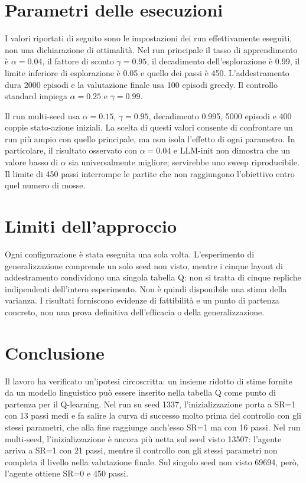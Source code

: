 \documentclass[12pt,a4paper]{article}
\begin{document}
\section{Parametri delle esecuzioni}\label{sec:iperparametri}
I valori riportati di seguito sono le impostazioni dei run effettivamente eseguiti, non una dichiarazione di ottimalità. Nel run principale il tasso di apprendimento è $\alpha=0.04$, il fattore di sconto $\gamma=0.95$, il decadimento dell'esplorazione è 0.99, il limite inferiore di esplorazione è 0.05 e quello dei passi è 450. L'addestramento dura 2000 episodi e la valutazione finale usa 100 episodi greedy. Il controllo standard impiega $\alpha=0.25$ e $\gamma=0.99$.

Il run multi-seed usa $\alpha=0.15$, $\gamma=0.95$, decadimento 0.995, 5000 episodi e 400 coppie stato-azione iniziali. La scelta di questi valori consente di confrontare un run più ampio con quello principale, ma non isola l'effetto di ogni parametro. In particolare, il risultato osservato con $\alpha=0.04$ e LLM-init non dimostra che un valore basso di $\alpha$ sia universalmente migliore; servirebbe uno sweep riproducibile. Il limite di 450 passi interrompe le partite che non raggiungono l'obiettivo entro quel numero di mosse.

\section{Limiti dell'approccio}\label{sec:limiti}
Ogni configurazione è stata eseguita una sola volta. L'esperimento di generalizzazione comprende un solo seed non visto, mentre i cinque layout di addestramento condividono una singola tabella Q: non si tratta di cinque repliche indipendenti dell'intero esperimento. Non è quindi disponibile una stima della varianza. I risultati forniscono evidenze di fattibilità e un punto di partenza concreto, non una prova definitiva dell'efficacia o della generalizzazione.

\section{Conclusione}\label{sec:conclusione}
Il lavoro ha verificato un'ipotesi circoscritta: un insieme ridotto di stime fornite da un modello linguistico può essere inserito nella tabella Q come punto di partenza per il Q-learning. Nel run su seed 1337, l'inizializzazione porta a SR=1 con 13 passi medi e fa salire la curva di successo molto prima del controllo con gli stessi parametri, che alla fine raggiunge anch'esso SR=1 ma con 16 passi. Nel run multi-seed, l'inizializzazione è ancora più netta sul seed visto 13507: l'agente arriva a SR=1 con 21 passi, mentre il controllo con gli stessi parametri non completa il livello nella valutazione finale. Sul singolo seed non visto 69694, però, l'agente ottiene SR=0 e 450 passi.
\end{document}
